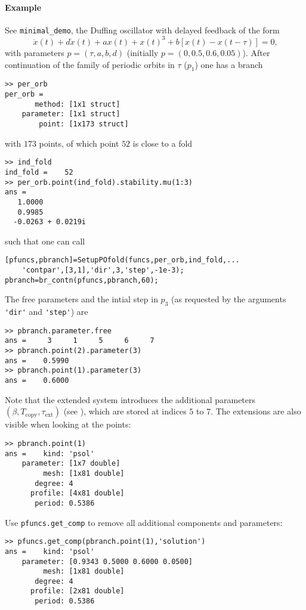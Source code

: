 \documentclass[11pt]{scrartcl}
\newcommand{\blist}[1]{\mbox{\lstinline!#1!}}  \newlength{\tabw}
\begin{document}
\paragraph{Example}
See \texttt{minimal\_demo}, the Duffing oscillator with delayed feedback of the form
\begin{equation}\label{eq:duff}
  \ddot x(t)+d \dot x(t)+a x(t)+x(t)^3+b[x(t)-x(t-\tau)]=0\mbox{,}
\end{equation}
with parameters $p=(\tau,a,b,d)$ (initially $p=(0, 0.5, 0.6, 0.05)$).
After continuation of the family of periodic orbits in $\tau$ ($p_1$)
one has a branch
{\small
\begin{verbatim}
>> per_orb
per_orb = 
       method: [1x1 struct]
    parameter: [1x1 struct]
        point: [1x173 struct]
\end{verbatim}
} with $173$ points, of which point $52$ is close to a fold
\begin{verbatim}
>> ind_fold
ind_fold =    52
>> per_orb.point(ind_fold).stability.mu(1:3)
ans =
   1.0000          
   0.9985          
  -0.0263 + 0.0219i
\end{verbatim}
such that one can call
\begin{lstlisting}
[pfuncs,pbranch]=SetupPOfold(funcs,per_orb,ind_fold,...
    'contpar',[3,1],'dir',3,'step',-1e-3);
pbranch=br_contn(pfuncs,pbranch,60);
\end{lstlisting}
The free parameters and the intial step in $p_3$ (as requested by
the arguments \blist{'dir'} and \blist{'step'}) are
\begin{verbatim}
>> pbranch.parameter.free
ans =     3     1     5     6     7
>> pbranch.point(2).parameter(3)
ans =    0.5990
>> pbranch.point(1).parameter(3)
ans =    0.6000
\end{verbatim}
Note that the extended system introduces the additional parameters
$(\beta,T_\mathrm{copy},\tau_\mathrm{ext})$ (see \cite{S13}), which
are stored at indices $5$ to $7$. The extensions are also visible when
looking at the points:
\begin{verbatim}
>> pbranch.point(1)
ans =    kind: 'psol'
    parameter: [1x7 double]
         mesh: [1x81 double]
       degree: 4
      profile: [4x81 double]
       period: 0.5386
\end{verbatim}
Use \blist{pfuncs.get_comp} to remove all additional components and parameters:
\begin{verbatim}
>> pfuncs.get_comp(pbranch.point(1),'solution')
ans =    kind: 'psol'
    parameter: [0.9343 0.5000 0.6000 0.0500]
         mesh: [1x81 double]
       degree: 4
      profile: [2x81 double]
       period: 0.5386
\end{verbatim}
\end{document}
